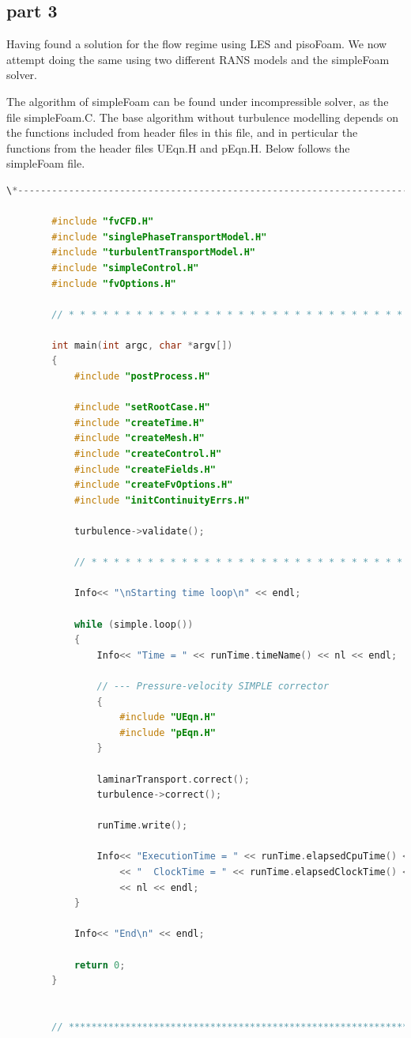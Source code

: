 \documentclass[paper=a4, fontsize=11pt]{article} %
\numberwithin{equation}{section} %
\numberwithin{figure}{section} %
\numberwithin{table}{section} %
\begin{document}
    \clearpage
    \subsection*{part 3}

    Having found a solution for the flow regime using LES and pisoFoam. We now attempt doing the same using two different RANS models and the simpleFoam solver. 


    The algorithm of simpleFoam can be found under incompressible solver, as the file simpleFoam.C. The base algorithm without turbulence modelling depends on the functions included from header files in this file, and in perticular the functions from the header files UEqn.H and pEqn.H. Below follows the simpleFoam file.
    
    
    \begin{lstlisting}[language=C++, captionpos=b, caption = source code for SimpleFoam]
        \*---------------------------------------------------------------------------*/

        #include "fvCFD.H"
        #include "singlePhaseTransportModel.H"
        #include "turbulentTransportModel.H"
        #include "simpleControl.H"
        #include "fvOptions.H"

        // * * * * * * * * * * * * * * * * * * * * * * * * * * * * * * * * * * * * * //

        int main(int argc, char *argv[])
        {
            #include "postProcess.H"

            #include "setRootCase.H"
            #include "createTime.H"
            #include "createMesh.H"
            #include "createControl.H"
            #include "createFields.H"
            #include "createFvOptions.H"
            #include "initContinuityErrs.H"

            turbulence->validate();

            // * * * * * * * * * * * * * * * * * * * * * * * * * * * * * * * * * * * //

            Info<< "\nStarting time loop\n" << endl;

            while (simple.loop())
            {
                Info<< "Time = " << runTime.timeName() << nl << endl;

                // --- Pressure-velocity SIMPLE corrector
                {
                    #include "UEqn.H"
                    #include "pEqn.H"
                }

                laminarTransport.correct();
                turbulence->correct();

                runTime.write();

                Info<< "ExecutionTime = " << runTime.elapsedCpuTime() << " s"
                    << "  ClockTime = " << runTime.elapsedClockTime() << " s"
                    << nl << endl;
            }

            Info<< "End\n" << endl;

            return 0;
        }


        // ************************************************************************* //
    \end{lstlisting}
\end{document}
